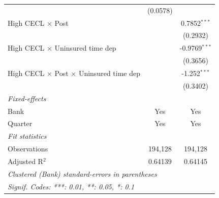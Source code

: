 \begin{tabular}{lcc}
                                                         & (0.0578)        &   \\   
   High CECL $\times$ Post                               &                 & 0.7852$^{***}$\\   
                                                         &                 & (0.2932)\\   
   High CECL $\times$ Uninsured time dep                 &                 & -0.9769$^{***}$\\   
                                                         &                 & (0.3656)\\   
   High CECL $\times$ Post $\times$ Uninsured time dep   &                 & -1.252$^{***}$\\   
                                                         &                 & (0.3402)\\   
   \midrule
   \emph{Fixed-effects}\\
   Bank                                                  & Yes             & Yes\\  
   Quarter                                               & Yes             & Yes\\  
   \midrule
   \emph{Fit statistics}\\
   Observations                                          & 194,128         & 194,128\\  
   Adjusted R$^2$                                        & 0.64139         & 0.64145\\  
   \midrule \midrule
   \multicolumn{3}{l}{\emph{Clustered (Bank) standard-errors in parentheses}}\\
   \multicolumn{3}{l}{\emph{Signif. Codes: ***: 0.01, **: 0.05, *: 0.1}}\\
\end{tabular}
\par\endgroup


